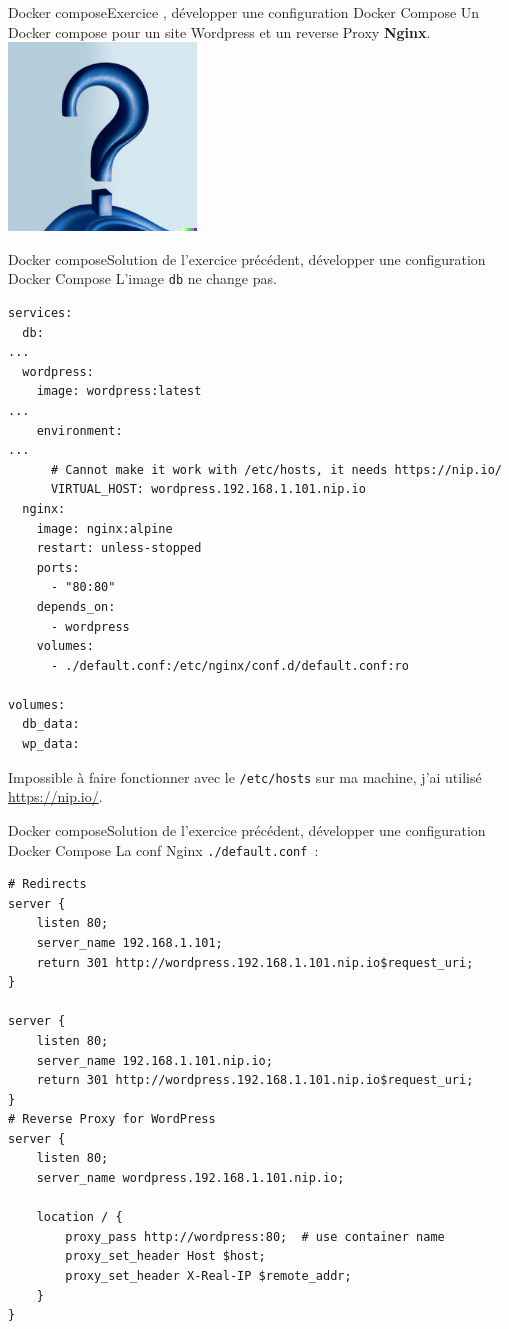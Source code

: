 \documentclass{beamer}
\begin{document}
    \begin{frame}{Docker compose}{Exercice \execcounterdispinc{}, développer une configuration Docker Compose}
        Un Docker compose pour un site Wordpress et un reverse Proxy \textbf{Nginx}.
        \bigbreak
        \centering
        \includegraphics[width=5cm]{image/question-mark-on-a-blank-background}
    \end{frame}

    \begin{frame}[fragile]{Docker compose}{Solution de l'exercice précédent, développer une configuration Docker Compose}
        L'image \lstinline{db} ne change pas.
        \begin{lstlisting}[basicstyle=\ttfamily\tiny]
services:
  db:
...
  wordpress:
    image: wordpress:latest
...
    environment:
...
      # Cannot make it work with /etc/hosts, it needs https://nip.io/
      VIRTUAL_HOST: wordpress.192.168.1.101.nip.io
  nginx:
    image: nginx:alpine
    restart: unless-stopped
    ports:
      - "80:80"
    depends_on:
      - wordpress
    volumes:
      - ./default.conf:/etc/nginx/conf.d/default.conf:ro

volumes:
  db_data:
  wp_data:
        \end{lstlisting}
        \begin{dangercolorbox}
            Impossible à faire fonctionner avec le \lstinline{/etc/hosts} sur ma machine, j'ai utilisé \url{https://nip.io/}.
        \end{dangercolorbox}
    \end{frame}

    \begin{frame}[fragile]{Docker compose}{Solution de l'exercice précédent, développer une configuration Docker Compose}
        La conf Nginx \lstinline{./default.conf}~:
        \begin{lstlisting}[basicstyle=\ttfamily\tiny]
# Redirects
server {
    listen 80;
    server_name 192.168.1.101;
    return 301 http://wordpress.192.168.1.101.nip.io$request_uri;
}

server {
    listen 80;
    server_name 192.168.1.101.nip.io;
    return 301 http://wordpress.192.168.1.101.nip.io$request_uri;
}
# Reverse Proxy for WordPress
server {
    listen 80;
    server_name wordpress.192.168.1.101.nip.io;

    location / {
        proxy_pass http://wordpress:80;  # use container name
        proxy_set_header Host $host;
        proxy_set_header X-Real-IP $remote_addr;
    }
}
        \end{lstlisting}
    \end{frame}
\end{document}
